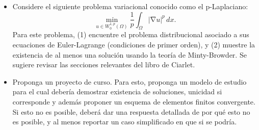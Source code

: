 \documentclass{article}
\DeclareMathOperator{\grad}{\nabla}
\begin{document}
\begin{itemize}
    \item Considere el siguiente problema variacional conocido como el p-Laplaciano:
            $$ \min_{u \in W_0^{1,p}(\Omega)} \frac 1 p \int_\Omega |\grad u|^p\,dx. $$
            Para este problema, (1) encuentre el problema distribucional asociado a sus ecuaciones de Euler-Lagrange (condiciones de primer orden), y (2) muestre la existencia de al menos una solución usando la teoría de Minty-Browder. Se sugiere revisar las secciones relevantes del libro de Ciarlet.
    \item Proponga un proyecto de curso. Para esto, proponga un modelo de estudio para el cual debería demostrar existencia de soluciones, unicidad si corresponde y además proponer un esquema de elementos finitos convergente. Si esto no es posible, deberá dar una respuesta detallada de por qué esto no es posible, y al menos reportar un caso simplificado en que si se podría. 
\end{itemize}
\end{document}
